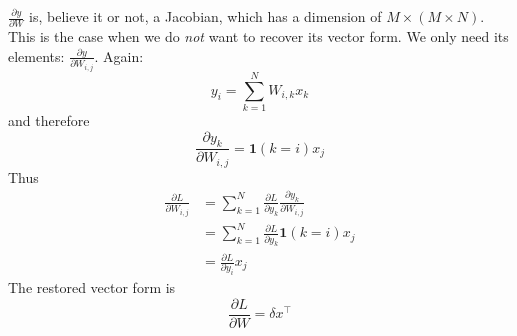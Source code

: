 \documentclass{article}
\begin{document}
$\frac{\partial y}{\partial W}$ is, believe it or not, a Jacobian, which has a dimension of $M\times(M\times N)$. This is the case when we do \emph{not} want to recover its vector form. We only need its elements: $\frac{\partial y}{\partial W_{i, j}}$. Again:
\begin{equation}
    y_i = \sum_{k=1}^NW_{i, k}x_k
\end{equation}
and therefore
\begin{equation}
    \frac{\partial y_k}{\partial W_{i, j}} = \mathbf{1}(k=i)x_j
\end{equation}
Thus
\begin{align}
    \frac{\partial L}{\partial W_{i, j}} 
    &= \sum_{k=1}^N\frac{\partial L}{\partial y_k}\frac{\partial y_k}{\partial W_{i, j}} \\
    &= \sum_{k=1}^N\frac{\partial L}{\partial y_k}\mathbf{1}(k=i)x_j \\
    &= \frac{\partial L}{\partial y_i}x_j
\end{align}
The restored vector form is
\begin{equation}
    \frac{\partial L}{\partial W} = \delta x^\top 
\end{equation}
\end{document}
